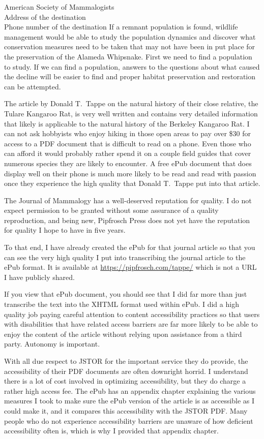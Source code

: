 \documentclass[letterpaper,11pt]{letter}
\begin{document}
\begin{letter}{American Society of Mammalogists\\Address of the destination\\Phone number of the destination}
If a remnant population is found, wildlife management would be able to study the population dynamics and discover what conservation measures need to be taken that may not have been in put place for the preservation of the Alameda Whipsnake. First we need to find a population to study. If we can find a population, answers to the questions about what caused the decline will be easier to find and proper habitat preservation and restoration can be attempted.

The article by Donald T.\ Tappe on the natural history of their close relative, the Tulare Kangaroo Rat, is very well written and contains very detailed information that likely is applicable to the natural history of the Berkeley Kangaroo Rat. I can not ask hobbyists who enjoy hiking in those open areas to pay over \$30 for access to a PDF document that is difficult to read on a phone. Even those who can afford it would probably rather spend it on a couple field guides that cover numerous species they are likely to encounter. A free ePub document that does display well on their phone is much more likely to be read and read with passion once they experience the high quality that Donald T.\ Tappe put into that article.

The Journal of Mammalogy has a well-deserved reputation for quality. I do not expect permission to be granted without some assurance of a quality reproduction, and being new, Pipfrosch Press does not yet have the reputation for quality I hope to have in five years.

To that end, I have already created the ePub for that journal article so that you can see the very high quality I put into transcribing the journal article to the ePub format. It is available at \url{https://pipfrosch.com/tappe/} which is not a URL I have publicly shared.

If you view that ePub document, you should see that I did far more than just transcribe the text into the XHTML format used within ePub. I did a high quality job paying careful attention to content accessibility practices so that users with disabilities that have related access barriers are far more likely to be able to enjoy the content of the article without relying upon assistance from a third party. Autonomy is important.

With all due respect to JSTOR for the important service they do provide, the accessibility of their PDF documents are often downright horrid. I understand there is a lot of cost involved in optimizing accessibility, but they do charge a rather high access fee. The ePub has an appendix chapter explaining the various measures I took to make sure the ePub version of the article is as accessible as I could make it, and it compares this accessibility with the JSTOR PDF. Many people who do not experience accessibility barriers are unaware of how deficient accessibility often is, which is why I provided that appendix chapter.


\end{letter}
\end{document}
